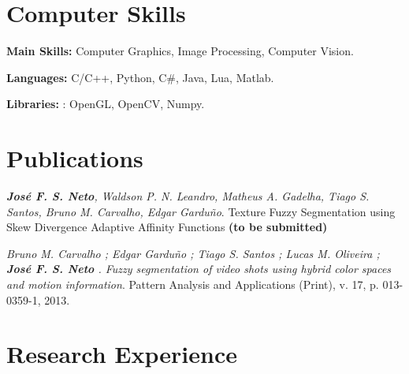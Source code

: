 \documentclass[letterpaper]{article}
\renewenvironment{itemize}{
  \begin{list}{}{
      \setlength{\leftmargin}{1.5em}
    }
  }{
  \end{list}
}
\begin{document}
\section*{Computer Skills}

\begin{itemize}
 \item \textbf{Main Skills:} Computer Graphics, Image Processing, Computer Vision.
  \item \textbf{Languages:} C/C++, Python, C\#, Java, Lua, Matlab.
  \item \textbf{Libraries:} : OpenGL, OpenCV, Numpy.

\end{itemize}

\section*{Publications}

\begin{itemize}

  \item \textit{\textbf{Jos\'e F. S. Neto}, Waldson P. N. Leandro, Matheus A. Gadelha, Tiago S. Santos, Bruno M. Carvalho, Edgar Gardu\~no}. Texture Fuzzy Segmentation using Skew Divergence Adaptive Affinity Functions \textbf{(to be submitted)}

  \item \textit{Bruno M. Carvalho ; Edgar Gardu\~no ; Tiago S. Santos ; Lucas M. Oliveira ; \textbf{Jos\'e F. S. Neto} . Fuzzy segmentation of video shots using hybrid color spaces and motion
  information}. Pattern Analysis and Applications (Print), v. 17, p. 013-0359-1, 2013. \\

\end{itemize}

\section*{Research Experience}
\end{document}
